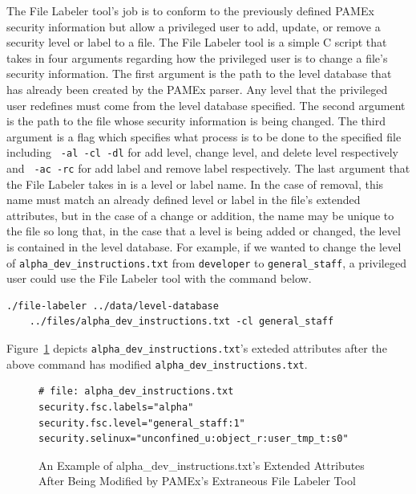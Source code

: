 The File Labeler tool’s job is to conform to the previously defined 
PAMEx security information but allow a privileged user to add, update, 
or remove a security level or label to a file. The File Labeler tool is 
a simple C script that takes in four arguments regarding how the 
privileged user is to change a file’s security information. The first 
argument is the path to the level database that has already been 
created by the PAMEx parser. Any level that the privileged user 
redefines must come from the level database specified. The second 
argument is the path to the file whose security information is being 
changed. The third argument is a flag which specifies what process is 
to be done to the specified file including \texttt{ -al -cl -dl} for add level, 
change level, and delete level respectively and \texttt{ -ac -rc} 
for add label 
and remove label respectively. The last argument that the File Labeler 
takes in is a level or label name. In the case of removal, this name 
must match an already defined level or label in the file’s extended 
attributes, but in the case of a change or addition, the name may be 
unique to the file so long that, in the case that a level is being 
added or changed, the level is contained in the level database. For 
example, if we wanted to change the level of \texttt{alpha}\texttt{\_dev}\texttt{\_instructions.txt} from \texttt{developer} to 
\texttt{general\_staff}, a privileged user could use the File Labeler tool with the 
command below. 

\begin{verbatim}
./file-labeler ../data/level-database 
    ../files/alpha_dev_instructions.txt -cl general_staff
\end{verbatim}

Figure~\ref{xattrmod} depicts \texttt{alpha}\texttt{\_dev}\texttt{\_instructions.txt}'s 
exteded attributes after the above command has modified \texttt{alpha}\texttt{\_dev}\texttt{\_instructions.txt}.

\begin{figure}[htb]
    \centering
    \begin{tcolorbox}[width=.8\textwidth, boxsep=5pt, sharp corners, colback=white, colframe=black, fontupper=\footnotesize\ttfamily] %
        \begin{minipage}{\textwidth} %
            \begin{lstlisting}
# file: alpha_dev_instructions.txt
security.fsc.labels="alpha"
security.fsc.level="general_staff:1"
security.selinux="unconfined_u:object_r:user_tmp_t:s0"
            \end{lstlisting}
        \end{minipage}
    \end{tcolorbox}
    \caption[Extended Attributes After Being Modified by PAMEx's Extraneous File Labeler Tool]{\label{xattrmod}An Example of alpha\_dev\_instructions.txt's Extended Attributes After Being Modified by PAMEx's Extraneous File Labeler Tool}
\end{figure}

